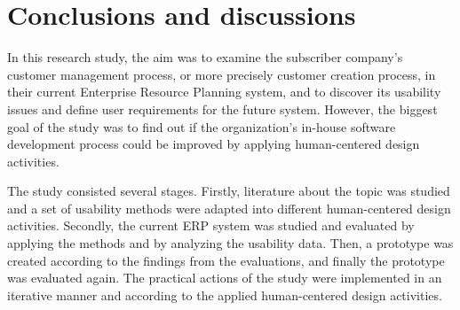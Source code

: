 \documentclass[12pt,a4paper,oneside,pdftex]{report}
\begin{document}




% 


% 










% 

\chapter{Conclusions and discussions}
\label{chapter:conclusion}

In this research study, the aim was to examine the subscriber company's customer management process, or more precisely customer creation process,  in their current Enterprise Resource Planning system, and to discover its usability issues and define user requirements for the future system. 
However, the biggest goal of the study was to find out if the organization's in-house software development process could be improved by applying human-centered design activities.

The study consisted several stages. Firstly, literature about the topic was studied and a set of usability methods were adapted into different human-centered design activities. Secondly, the current ERP system was studied and evaluated by applying the methods and by analyzing the usability data. Then, a prototype was created according to the findings from the evaluations, and finally the prototype was evaluated again. The practical actions of the study were implemented in an iterative manner and according to the applied human-centered design activities.
\end{document}
